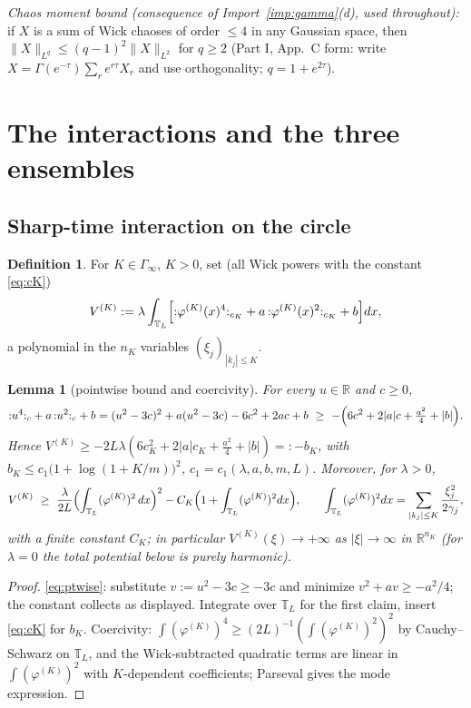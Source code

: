 \documentclass[11pt,a4paper]{article}
\theoremstyle{plain}
\newtheorem{lemma}[theorem]{Lemma}
\theoremstyle{definition}
\newtheorem{definition}[theorem]{Definition}
\newcommand{\R}{\mathbb{R}}
\newcommand{\T}{\mathbb{T}}
\newcommand{\Gam}{\Gamma}
\begin{document}
\noindent\emph{Chaos moment bound (consequence of
Import~\ref{imp:gamma}(d), used throughout):} if $X$ is a sum of Wick
chaoses of order $\le4$ in any Gaussian space, then
$\|X\|_{L^q}\le(q-1)^2\|X\|_{L^2}$ for $q\ge2$ (Part I, App.\ C form:
write $X=\Gam(e^{-\tau})\sum_re^{r\tau}X_r$ and use orthogonality;
$q=1+e^{2\tau}$).

\section{The interactions and the three ensembles}\label{sec:interactions}

\subsection{Sharp-time interaction on the circle}

\begin{definition}\label{def:VK}
For $K\in\Gamma_\infty$, $K>0$, set (all Wick powers with the constant
\eqref{eq:cK})
\[
 V^{(K)}:=\lambda\int_{\T_L}\Bigl[{:}\varphi^{(K)}(x)^4{:}_{c_K}
 +a\,{:}\varphi^{(K)}(x)^2{:}_{c_K}+b\Bigr]dx ,
\]
a polynomial in the $n_K$ variables $(\xi_j)_{|k_j|\le K}$.
\end{definition}

\begin{lemma}[pointwise bound and coercivity]\label{lem:pointwise}
For every $u\in\R$ and $c\ge0$,
\begin{equation}
 {:}u^4{:}_c+a\,{:}u^2{:}_c+b
 =(u^2-3c)^2+a(u^2-3c)-6c^2+2ac+b
 \ \ge\ -\Bigl(6c^2+2|a|c+\tfrac{a^2}4+|b|\Bigr).
 \label{eq:ptwise}
\end{equation}
Hence $V^{(K)}\ge-2L\lambda(6c_K^2+2|a|c_K+\tfrac{a^2}4+|b|)
=:-b_K$, with $b_K\le c_1\bigl(1+\log(1+K/m)\bigr)^2$,
$c_1=c_1(\lambda,a,b,m,L)$. Moreover, for $\lambda>0$,
\[
 V^{(K)}\ \ge\ \frac\lambda{2L}\Bigl(\int_{\T_L}(\varphi^{(K)})^2\,
 dx\Bigr)^{2}-C_K\Bigl(1+\int_{\T_L}(\varphi^{(K)})^2dx\Bigr),
 \qquad
 \int_{\T_L}(\varphi^{(K)})^2dx=\sum_{|k_j|\le K}
 \frac{\xi_j^2}{2\gamma_j},
\]
with a finite constant $C_K$; in particular
$V^{(K)}(\xi)\to+\infty$ as $|\xi|\to\infty$ in $\R^{n_K}$
(for $\lambda=0$ the total potential below is purely harmonic).
\end{lemma}

\begin{proof}
\eqref{eq:ptwise}: substitute $v:=u^2-3c\ge-3c$ and minimize
$v^2+av\ge-a^2/4$; the constant collects as displayed. Integrate over
$\T_L$ for the first claim, insert \eqref{eq:cK} for $b_K$. Coercivity:
$\int(\varphi^{(K)})^4\ge(2L)^{-1}(\int(\varphi^{(K)})^2)^2$ by
Cauchy--Schwarz on $\T_L$, and the Wick-subtracted quadratic terms are
linear in $\int(\varphi^{(K)})^2$ with $K$-dependent coefficients;
Parseval gives the mode expression.
\end{proof}
\end{document}
